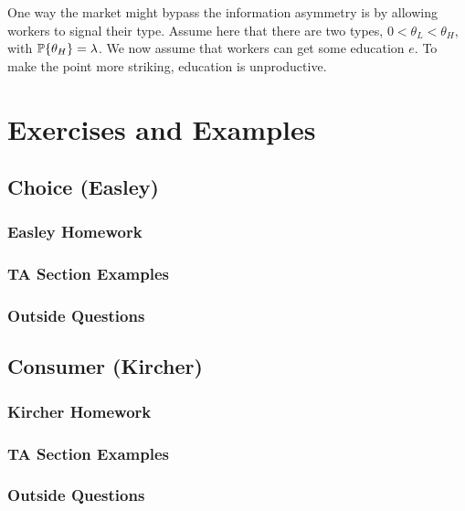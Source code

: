 \documentclass[12pt]{article}
\begin{document}
\begin{example}
	One way the market might bypass the information asymmetry is by allowing workers to signal their type. Assume here that there are two types, $0 < \theta_L < \theta_H$, with $\mathbb{P}\{\theta_H\} = \lambda$. We now assume that workers can get some education $e$. To make the point more striking, education is unproductive. 
\end{example}

\newpage
\section{Exercises and Examples}\label{sec:exercises}

\subsection{Choice (Easley)}

\subsubsection{Easley Homework}

\subsubsection{TA Section Examples}

\subsubsection{Outside Questions}

\subsection{Consumer (Kircher)}

\subsubsection{Kircher Homework}

\subsubsection{TA Section Examples}

\subsubsection{Outside Questions}
\end{document}
